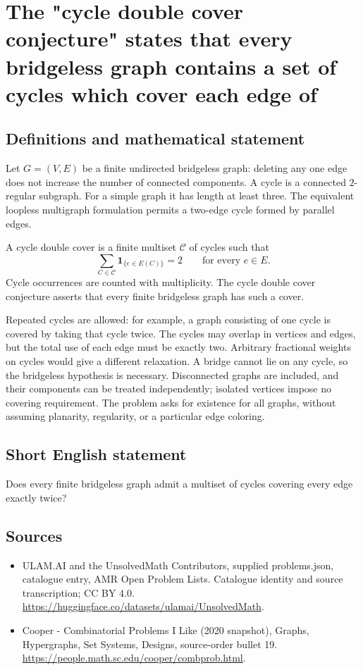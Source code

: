\documentclass[11pt,a4paper]{article}
\begin{document}
\section*{The "cycle double cover conjecture" states that every bridgeless graph contains a set of cycles which cover each edge of}\label{statement}

\subsection{Definitions and mathematical statement}
Let $G=(V,E)$ be a finite undirected bridgeless graph: deleting any
one edge does not increase the number of connected components.
A cycle is a connected $2$-regular subgraph. For a simple graph
it has length at least three. The equivalent loopless multigraph
formulation permits a two-edge cycle formed by parallel edges.

A cycle double cover is a finite multiset $\mathcal C$ of cycles
such that
\[
            \sum_{C\in\mathcal C}\mathbf 1_{\{e\in E(C)\}}=2
                       \qquad\text{for every }e\in E.
\]
Cycle occurrences are counted with multiplicity. The cycle double
cover conjecture asserts that every finite bridgeless graph has
such a cover.

Repeated cycles are allowed: for example, a graph consisting of
one cycle is covered by taking that cycle twice. The cycles may
overlap in vertices and edges, but the total use of each edge must
be exactly two. Arbitrary fractional weights on cycles would give
a different relaxation. A bridge cannot lie on any cycle, so the
bridgeless hypothesis is necessary. Disconnected graphs are
included, and their components can be treated independently;
isolated vertices impose no covering requirement. The problem
asks for existence for all graphs, without assuming planarity,
regularity, or a particular edge coloring.
\subsection{Short English statement}
Does every finite bridgeless graph admit a multiset of cycles covering every edge exactly twice?
\subsection{Sources}
\begin{itemize}
\item[S1] ULAM.AI and the UnsolvedMath Contributors, supplied problems.json, catalogue entry, AMR Open Problem Lists. Catalogue identity and source transcription; CC BY 4.0.
\url{https://huggingface.co/datasets/ulamai/UnsolvedMath}.
\item[S2] Cooper - Combinatorial Problems I Like (2020 snapshot), Graphs, Hypergraphs, Set Systems, Designs, source-order bullet 19. 
\url{https://people.math.sc.edu/cooper/combprob.html}.
\end{itemize}
\end{document}
